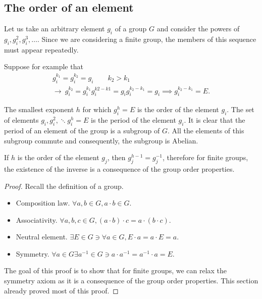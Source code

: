 
\subsection{The order of an element} %
\label{sub:The order of an element}

Let us take an arbitrary element $g_i$ of a group $G$ and consider the powers of
$g_i,g_i^2,g_i^3,\dots$. Since we are considering a finite group, the members of
this sequence must appear repeatedly.

Suppose for example that
\begin{align}
    g_i^{k_1}=g_i^{k_2}=g_i\qquad k_2>k_1\\
    \rightarrow\ g_i^{k_2}=g_i^{k_1}g_i^{k2-k1}=g_ig_i^{k_2-k_1}=g_i\implies
    g_i^{k_2-k_1}=E.
\end{align}

The smallest exponent $h$ for which $g_i^h=E$ is the order of the element $g_i$.
The set of elements $g_i,g_i^2,\ddots g_i^h=E$ is the period of the element $g_i$.
It is clear that the period of an element of the group is a subgroup of $G$. All
the elements of this subgroup commute and consequently, the subgroup is Abelian.

If $h$ is the order of the element $g_j$, then $g_j^{h-1}=g_j^{-1}$,
therefore
for finite groups, the existence of the inverse is a consequence of the group
order properties.
\begin{proof}
    Recall the definition of a group.
    \begin{itemize}
        \item Composition law. $\forall a,b\in G, a\cdot b\in G$.
        \item Associativity. $\forall a,b,c\in G,
            (a\cdot b)\cdot c=a\cdot(b\cdot c)$.
        \item Neutral element. $\exists E\in G\ni \forall a\in G, E\cdot a=a\cdot E=a$.
        \item Symmetry. $\forall a\in G\exists a^{-1}\in G\ni
            a\cdot a^{-1}=a^{-1}\cdot a=E$.
    \end{itemize}
    The goal of this proof is to show that for finite groups, we can relax the
    symmetry axiom as it is a consequence of the group order properties. This
    section already proved most of this proof.
\end{proof}



